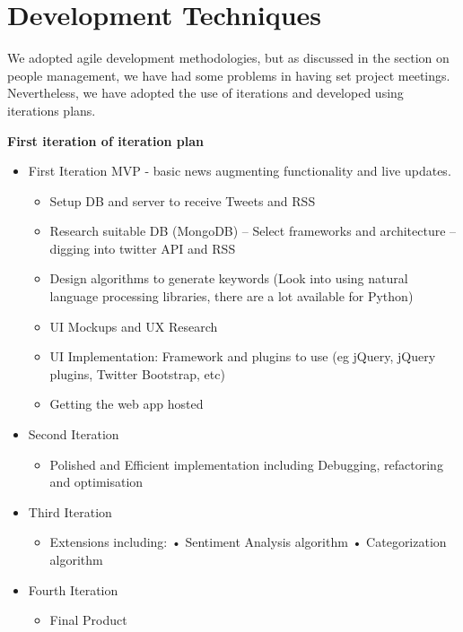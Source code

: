 \documentclass{report}
\begin{document}
		\section{Development Techniques}
		
		We adopted agile development methodologies, but as discussed in the section on people management, we have had some problems in having set project meetings. Nevertheless, we have adopted the use of iterations and developed using iterations plans.
		
		\textbf{First iteration of iteration plan}

		\begin{itemize}
			\item First Iteration MVP - basic news augmenting functionality and live updates.
			\begin{itemize}
				\item Setup DB and server to receive Tweets and RSS
				\item Research suitable DB (MongoDB) – Select frameworks and architecture – digging into twitter API and RSS
				\item Design algorithms to generate keywords (Look into using natural language processing libraries, there are a lot available for Python)
				\item UI Mockups and UX Research
				\item UI Implementation: Framework and plugins to use (eg jQuery, jQuery plugins, Twitter Bootstrap, etc)
				\item Getting the web app hosted
			\end{itemize}
			
			\item Second Iteration
			\begin{itemize}
				\item Polished and Efficient implementation including Debugging, refactoring and optimisation
			\end{itemize}
			
			\item Third Iteration
			\begin{itemize}
				\item Extensions including: • Sentiment Analysis algorithm • Categorization algorithm 
			\end{itemize}
			
			\item Fourth Iteration
			\begin{itemize}
				\item Final Product
			\end{itemize}
			
		\end{itemize}
		
\end{document}
